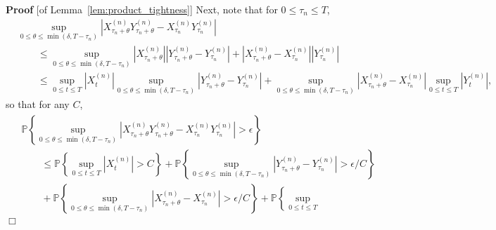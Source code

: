 \documentclass[12pt]{article}
\newenvironment {proof}{{\noindent\bf Proof }}{\hfill $\Box$ \medskip}
\newcommand{\IP}{\mathbb P}
\numberwithin{equation}{section}
\begin{document}
\begin{proof}[of Lemma~\ref{lem:product_tightness}]
    Next, note that for $0 \le \tau_n \le T$,
    \begin{align*}
        &
        \sup_{0 \le \theta \le \min(\delta, T-\tau_n)} 
        \left|
            X^{(n)}_{\tau_n + \theta} Y^{(n)}_{\tau_n + \theta} 
            -
            X^{(n)}_{\tau_n} Y^{(n)}_{\tau_n} 
        \right|
        \\ &\qquad 
        \le
        \sup_{0 \le \theta \le \min(\delta, T-\tau_n)} 
        \left| X^{(n)}_{\tau_n + \theta} \right|
        \left|
            Y^{(n)}_{\tau_n + \theta} 
            -
            Y^{(n)}_{\tau_n} 
        \right|
        +
        \left|
            X^{(n)}_{\tau_n + \theta}
            -
            X^{(n)}_{\tau_n}
        \right|
        \left| Y^{(n)}_{\tau_n} \right|
        \\ &\qquad 
        \le
        \sup_{0 \le t \le T}
            \left| X^{(n)}_t \right|
        \sup_{0 \le \theta \le \min(\delta, T-\tau_n)} 
        \left|
            Y^{(n)}_{\tau_n + \theta} 
            -
            Y^{(n)}_{\tau_n} 
        \right|
        +
        \sup_{0 \le \theta \le \min(\delta, T-\tau_n)} 
        \left|
            X^{(n)}_{\tau_n + \theta}
            -
            X^{(n)}_{\tau_n}
        \right|
        \sup_{0 \le t \le T}
        \left| Y^{(n)}_t \right| ,
    \end{align*}
    so that for any $C$,
    \begin{align} \label{eqn:xy_bound}
        \begin{split}
        &
        \IP\left\{
        \sup_{0 \le \theta \le \min(\delta, T-\tau_n)} 
        \left|
            X^{(n)}_{\tau_n + \theta} Y^{(n)}_{\tau_n + \theta} 
            -
            X^{(n)}_{\tau_n} Y^{(n)}_{\tau_n} 
        \right|
        > \epsilon
        \right\}
    \\ &\qquad \le
        \IP\left\{
            \sup_{0 \le t \le T}
                \left| X^{(n)}_t \right|
            > C
        \right\}
    +
        \IP\left\{
        \sup_{0 \le \theta \le \min(\delta, T-\tau_n)} 
        \left|
            Y^{(n)}_{\tau_n + \theta} 
            -
            Y^{(n)}_{\tau_n} 
        \right|
            > \epsilon/C
        \right\}
    \\ &\qquad {} +
        \IP\left\{
        \sup_{0 \le \theta \le \min(\delta, T-\tau_n)} 
        \left|
            X^{(n)}_{\tau_n + \theta} 
            -
            X^{(n)}_{\tau_n} 
        \right|
            > \epsilon/C
        \right\}
    +
        \IP\left\{
            \sup_{0 \le t \le T}

\end{split}
\end{align}
\end{proof}
\end{document}
